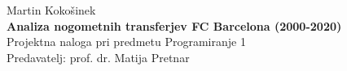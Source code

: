 \documentclass[a4paper, 12pt]{article}
\begin{document}
\thispagestyle{empty}
\vfill

\begin{center}{\large
Martin Kokošinek\\[2mm]
{\bf Analiza nogometnih transferjev FC Barcelona (2000-2020)}\\[10mm]
Projektna naloga pri predmetu Programiranje 1\\[1cm]
Predavatelj: prof. dr. Matija Pretnar}
\end{center}
\vfill

\pagebreak

\thispagestyle{empty}
\tableofcontents
\pagebreak
\end{document}
